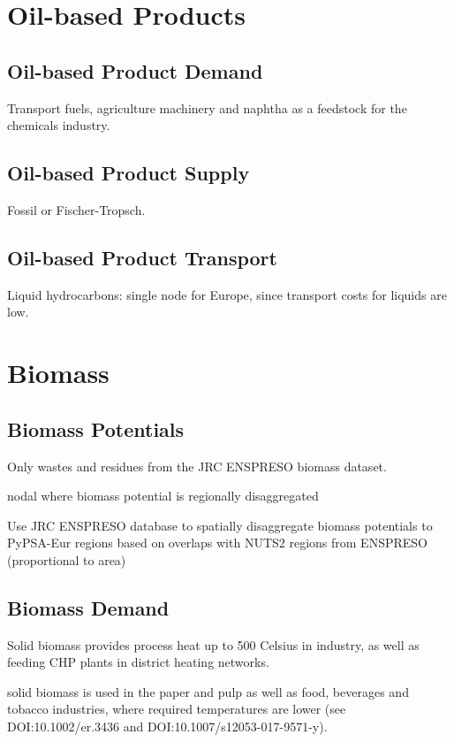 \section{Oil-based Products}

\subsection{Oil-based Product Demand}

Transport fuels, agriculture machinery and naphtha as a feedstock for the
chemicals industry.

\subsection{Oil-based Product Supply}

Fossil or Fischer-Tropsch.

\subsection{Oil-based Product Transport}

Liquid hydrocarbons: single node for Europe, since transport costs for liquids are low.


\section{Biomass}

\subsection{Biomass Potentials}

Only wastes and residues from the JRC ENSPRESO biomass dataset.

nodal where biomass potential is regionally disaggregated 

Use JRC ENSPRESO database to spatially disaggregate biomass potentials to
PyPSA-Eur regions based on overlaps with NUTS2 regions from ENSPRESO
(proportional to area)

\subsection{Biomass Demand}

Solid biomass provides process heat up to 500 Celsius in industry, as well as
feeding CHP plants in district heating networks.

solid biomass is used in the paper and pulp as well as food, beverages and
tobacco industries, where required temperatures are lower (see
DOI:10.1002/er.3436 and DOI:10.1007/s12053-017-9571-y).

